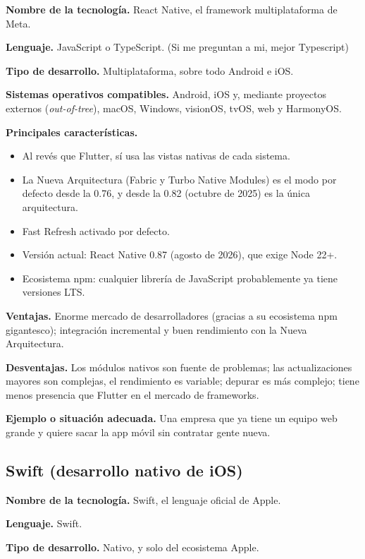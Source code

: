 \documentclass[11pt,a4paper]{article}
\newcommand{\campo}[1]{\textbf{\color{navy}#1}}
\begin{document}
	\campo{Nombre de la tecnología.} React Native, el framework multiplataforma de Meta.
	
  \campo{Lenguaje.} JavaScript o TypeScript. (Si me preguntan a mi, mejor Typescript)
	
	\campo{Tipo de desarrollo.} Multiplataforma, sobre todo Android e iOS.
	
	\campo{Sistemas operativos compatibles.} Android, iOS y, mediante proyectos externos (\emph{out-of-tree}), macOS, Windows, visionOS, tvOS, web y HarmonyOS.
	
	\campo{Principales características.}
	\begin{itemize}[leftmargin=*,itemsep=0.2em,topsep=0.2em]
		\item Al revés que Flutter, sí usa las vistas nativas de cada sistema.
		\item La Nueva Arquitectura (Fabric y Turbo Native Modules) es el modo por defecto desde la 0.76, y desde la 0.82 (octubre de 2025) es la única arquitectura.
		\item Fast Refresh activado por defecto.
		\item Versión actual: React Native 0.87 (agosto de 2026), que exige Node 22+.
		\item Ecosistema npm: cualquier librería de JavaScript probablemente ya tiene versiones LTS.
	\end{itemize}
	
  \campo{Ventajas.} Enorme mercado de desarrolladores (gracias a su ecosistema npm gigantesco); integración incremental y buen rendimiento con la Nueva Arquitectura.
	
	\campo{Desventajas.} Los módulos nativos son fuente de problemas; las actualizaciones mayores son complejas, el rendimiento es variable; depurar es más complejo; tiene menos presencia que Flutter en el mercado de frameworks.
	
	\campo{Ejemplo o situación adecuada.} Una empresa que ya tiene un equipo web grande y quiere sacar la app móvil sin contratar gente nueva.
	
	\subsection{Swift (desarrollo nativo de iOS)}
	
	\campo{Nombre de la tecnología.} Swift, el lenguaje oficial de Apple.
	
	\campo{Lenguaje.} Swift.
	
	\campo{Tipo de desarrollo.} Nativo, y solo del ecosistema Apple.
	
\end{document}
